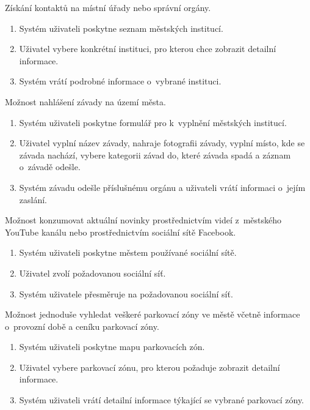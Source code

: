 Získání kontaktů na místní úřady nebo správní orgány. 

\begin{enumerate}
  \item Systém uživateli poskytne seznam městských institucí.
  \item Uživatel vybere konkrétní instituci, pro kterou chce zobrazit detailní informace.
  \item Systém vrátí podrobné informace o~vybrané instituci.  
\end{enumerate}

Možnost nahlášení závady na území města.

\begin{enumerate}
  \item Systém uživateli poskytne formulář pro k~vyplnění městských institucí.
  \item Uživatel vyplní název závady, nahraje fotografii závady, vyplní místo, kde se závada nachází, vybere kategorii závad do, které závada spadá a 
  záznam o~závadě odešle.
  \item Systém závadu odešle příslušnému orgánu a uživateli vrátí informaci o~jejím zaslání.
  
\end{enumerate}

Možnost konzumovat aktuální novinky prostřednictvím videí z~městského YouTube kanálu nebo prostřednictvím sociální sítě Facebook.

\begin{enumerate}
  \item Systém uživateli poskytne městem používané sociální sítě.
  \item Uživatel zvolí požadovanou sociální síť.
  \item Systém uživatele přesměruje na požadovanou sociální síť.
\end{enumerate}

Možnost jednoduše vyhledat veškeré parkovací zóny ve městě včetně informace o~provozní době a ceníku parkovací zóny.

\begin{enumerate}
  \item Systém uživateli poskytne mapu parkovacích zón.
  \item Uživatel vybere parkovací zónu, pro kterou požaduje zobrazit detailní informace.
  \item Systém uživateli vrátí detailní informace týkající se vybrané parkovací zóny.
\end{enumerate}

